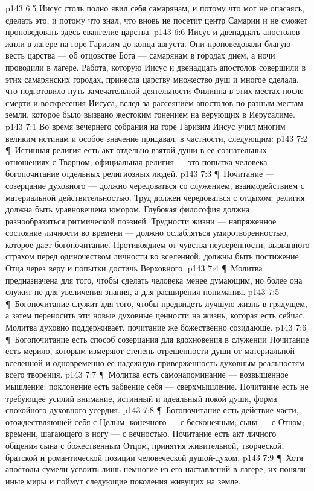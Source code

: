 \vs p143 6:5 Иисус столь полно явил себя самарянам, и потому что мог не опасаясь, сделать это, и потому что знал, что вновь не посетит центр Самарии и не сможет проповедовать здесь евангелие царства.
\vs p143 6:6 Иисус и двенадцать апостолов жили в лагере на горе Гаризим до конца августа. Они проповедовали благую весть царства --- об отцовстве Бога --- самарянам в городах днем, а ночи проводили в лагере. Работа, которую Иисус и двенадцать апостолов совершили в этих самарянских городах, принесла царству множество душ и многое сделала, что подготовило путь замечательной деятельности Филиппа в этих местах после смерти и воскресения Иисуса, вслед за рассеянием апостолов по разным местам земли, которое было вызвано жестоким гонением на верующих в Иерусалиме.
\vs p143 7:1 Во время вечернего собрания на горе Гаризим Иисус учил многим великим истинам и особое значение придавал, в частности, следующим:
\vs p143 7:2 \P\ Истинная религия есть акт отдельно взятой души в ее сознательных отношениях с Творцом; официальная религия --- это попытка человека  богопочитание отдельных религиозных людей.
\vs p143 7:3 \P\ Почитание --- созерцание духовного --- должно чередоваться со служением, взаимодействием с материальной действительностью. Труд должен чередоваться с отдыхом; религия должна быть уравновешена юмором. Глубокая философия должна разнообразиться ритмической поэзией. Трудности жизни --- напряженное состояние личности во времени --- должно ослабляться умиротворенностью, которое дает богопочитание. Противоядием от чувства неуверенности, вызванного страхом перед одиночеством личности во вселенной, должны быть постижение Отца через веру и попытки достичь Верховного.
\vs p143 7:4 \P\ Молитва предназначена для того, чтобы сделать человека менее думающим, но более  она служит не для увеличения знания, а для расширения понимания.
\vs p143 7:5 \P\ Богопочитание служит для того, чтобы предвидеть лучшую жизнь в грядущем, а затем переносить эти новые духовные ценности на жизнь, которая есть сейчас. Молитва духовно поддерживает, почитание же божественно созидающе.
\vs p143 7:6 \P\ Богопочитание есть способ созерцания  для вдохновения в служении  Почитание есть мерило, которым измеряют степень отрешенности души от материальной вселенной и одновременно ее надежную приверженность духовным реальностям всего творения.
\vs p143 7:7 \P\ Молитва есть самонапоминание --- возвышенное мышление; поклонение есть забвение себя --- сверхмышление. Почитание есть не требующее усилий внимание, истинный и идеальный покой души, форма спокойного духовного усердия.
\vs p143 7:8 \P\ Богопочитание есть действие части, отождествляющей себя с Целым; конечного --- с бесконечным; сына --- с Отцом; времени, шагающего в ногу --- с вечностью. Почитание есть акт личного общения сына с божественным Отцом, принятия живительной, творческой, братской и романтической позиции человеческой душой\hyp{}духом.
\vs p143 7:9 \P\ Хотя апостолы сумели усвоить лишь немногие из его наставлений в лагере, их поняли иные миры и поймут следующие поколения живущих на земле.
